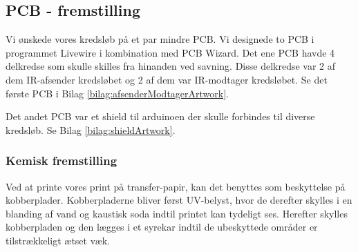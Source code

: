 \subsection{PCB - fremstilling}\label{subs:pcbfremstilling}
Vi ønskede vores kredsløb på et par mindre PCB. Vi designede to PCB i programmet Livewire i kombination med PCB Wizard. Det ene PCB havde 4 delkredse som skulle skilles fra hinanden ved savning. Disse delkredse var 2 af dem IR-afsender kredsløbet og 2 af dem var IR-modtager kredsløbet. Se det første PCB i Bilag \ref{bilag:afsenderModtagerArtwork}. 

Det andet PCB var et shield til arduinoen der skulle forbindes til diverse kredsløb. Se Bilag \ref{bilag:shieldArtwork}.
\subsubsection{Kemisk fremstilling}
Ved at printe vores print på transfer-papir, kan det benyttes som beskyttelse på kobberplader. Kobberpladerne bliver først UV-belyst, hvor de derefter skylles i en blanding af vand og kaustisk soda indtil printet kan tydeligt ses. Herefter skylles kobberpladen og den lægges i et syrekar indtil de ubeskyttede områder er tilstrækkeligt ætset væk.

